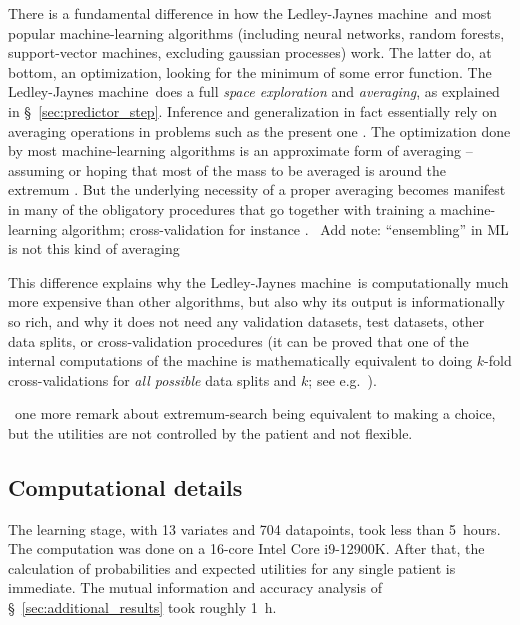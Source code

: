 \documentclass[utf8]{FrontiersinHarvard} %
\newcommand*{\wrench}{{\fontencoding{U}\fontfamily{fontawesomethree}\selectfont\symbol{114}}}
\newcommand*{\pencil}{{\fontencoding{U}\fontfamily{fontawesometwo}\selectfont\symbol{210}}}
\newcommand{\mynotew}[1]{{\color{notecolour}\wrench\ #1}}
\newcommand{\mynotep}[1]{{\color{notecolour}\pencil\ #1}}
\newcommand*{\sect}{\S}%
\newcommand*{\sects}{\S\S}%
\newcommand*{\chap}{ch.}%
\newcommand*{\eg}{{e.g.}}
\renewcommand*{\|}[1][]{\nonscript\:#1\vert\nonscript\:\mathopen{}}
\newcommand*{\ljm}{Ledley-Jaynes machine}
\begin{document}
There is a fundamental difference in how the \ljm\ and most popular machine-learning algorithms (including neural networks, random forests, support-vector machines, excluding gaussian processes) work. The latter do, at bottom, an optimization, looking for the minimum of some error function. The \ljm\ does a full \emph{space exploration} and \emph{averaging}, as explained in \sect~\ref{sec:predictor_step}. Inference and generalization in fact essentially rely on averaging operations in problems such as the present one \citetext{\citealt{definetti1930,definetti1937,dawid2013}; \citealt[\sects~4.2--4.3]{bernardoetal1994_r2000}; see also \citealt{selfetal1987}}. The optimization done by most machine-learning algorithms is an approximate form of averaging -- assuming or hoping that most of the mass to be averaged is around the extremum \citep[\chap~16]{mackay1992,murphy2012}. But the underlying necessity of a proper averaging becomes manifest in many of the obligatory procedures that go together with training a machine-learning algorithm; cross-validation for instance \citep{mackay1992b}. \mynotew{Add note: \enquote{ensembling} in ML is not this kind of averaging \citep[\sect~18.2]{murphy2022}}

This difference explains why the \ljm\ is computationally much more expensive than other algorithms, but also why its output is informationally so rich, and why it does not need any validation datasets, test datasets, other data splits, or cross-validation procedures (it can be proved that one of the internal computations of the machine is mathematically equivalent to doing $k$-fold cross-validations for \emph{all possible} data splits and $k$; see \eg\ \citealt{portamana2019b,fongetal2020}).

\mynotep{one more remark about extremum-search being equivalent to making a choice, but the utilities are not controlled by the patient and not flexible.}


\subsection{Computational details}
\label{sec:comput_details}

The learning stage, with 13 variates and 704 datapoints, took less than 5~hours. The computation was done on a 16-core Intel Core i9-12900K. After that, the calculation of probabilities and expected utilities for any single patient is immediate. The mutual information and accuracy analysis of \sect~\ref{sec:additional_results} took roughly 1~h.
\end{document}
